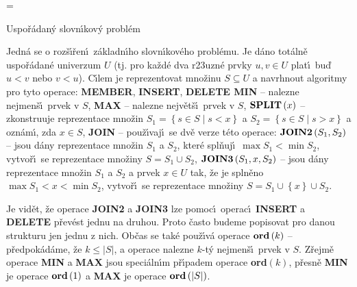 



\magnification=
\pagewidth{5.4in}


\def \emph#1{\underbar{#1}}
\def \Prob{\operatorname{Prob}}
\def \count{\operatorname{count}}
\def \NIL{\operatorname{NIL}}
\def \otec{\operatorname{otec}}
\def \list{\operatorname{list}}
\def \Prv{\operatorname{Prv}}
\def \Nasl{\operatorname{Nasl}}
\def \levy{\operatorname{levy}}
\def \pravy{\operatorname{pravy}}
\def \bratr{\operatorname{bratr}}
\def \Prst{\operatorname{Prst}}
\def \key{\operatorname{key}}
\def \hloubka{\operatorname{hloubka}}


\heading
Uspo\v r\'adan\'y slovn\'\i kov\'y probl\'em
\endheading

\flushpar Jedn\'a se o roz\v s\'\i\v ren\'\i\ z\'akladn\'\i ho slovn\'\i kov\'eho probl\'emu. Je 
d\'ano tot\'aln\v e uspo\v r\'adan\'e univerzum $U$ (tj. pro ka\v zd\'e dva 
r\accent23uzn\'e prvky $u,v\in U$ plat\'\i\ bu\v d $u<v$ nebo $v<
u$). C\'\i lem 
je reprezentovat 
mno\v zinu $S\subseteq U$ a navrhnout algoritmy pro tyto operace:\newline 
{\bf MEMBER}, {\bf INSERT}, {\bf DELETE\newline 
MIN} -- nalezne nejmen\v s\'\i\ prvek v $S$,\newline 
{\bf MAX} -- nalezne nejv\v et\v s\'\i\ prvek v $S$,\newline 
$\bold S\bold P\bold L\bold I\bold T\left(x\right)$ -- zkonstruuje reprezentace mno\v zin 
$S_1=\left\{s\in S\mid s<x\right\}$ a $S_2=\left\{s\in S\mid s>x\right\}$ a ozn\'am\'\i , zda 
$x\in S$,\newline 
{\bf JOIN} -- pou\v z\'\i vaj\'\i\ se dv\v e verze t\'eto operace:\newline 
$\bold J\bold O\bold I\bold N\bold 2\left(S_1,S_2\right)$ -- jsou d\'any reprezentace mno\v zin $
S_1$ a $S_2$, kter\'e 
spl\v nuj\'\i\ $\max S_1<\min S_2$, vytvo\v r\'\i\ se reprezentace mno\v ziny 
$S=S_1\cup S_2$,\newline 
$\bold J\bold O\bold I\bold N\bold 3\left(S_1,x,S_2\right)$ -- jsou d\'any reprezentace mno\v zin $
S_1$ a $S_2$ a 
prvek $x\in U$ tak, \v ze je spln\v eno $\max S_1<x<\min S_2$, vytvo\v r\'\i\ 
se reprezentace mno\v ziny $S=S_1\cup \left\{x\right\}\cup S_2$.
\smallskip

\flushpar Je vid\v et, \v ze operace {\bf JOIN2} a {\bf JOIN3} lze pomoc\'\i\ ope\-rac\'\i\ 
{\bf INSERT} a {\bf DELETE} p\v rev\'est jednu na druhou. Proto \v casto budeme 
popisovat pro danou strukturu jen jednu z nich. 
Ob\v cas se tak\'e pou\v z\'\i v\'a operace\newline 
$\bold o\bold r\bold d\left(k\right)$ -- p\v redpok\'ad\'ame, \v ze $k\le |S
|$, a operace nalezne $k$-t\'y 
nejmen\v s\'\i\ prvek v $S$.\newline 
Z\v rejm\v e operace {\bf MIN} a {\bf MAX} jsou speci\'aln\'\i m p\v r\'\i padem 
ope\-race {\bf ord$\left(k\right)$}, 
p\v resn\v e {\bf MIN} je operace $\bold o\bold r\bold d\left(1\right)$ a {\bf MAX} je operace $
\bold o\bold r\bold d\left(|S|\right)$.


